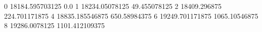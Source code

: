 0 18184.595703125 0.0
1 18234.05078125 49.455078125
2 18409.296875 224.701171875
4 18835.185546875 650.58984375
6 19249.701171875 1065.10546875
8 19286.0078125 1101.412109375
